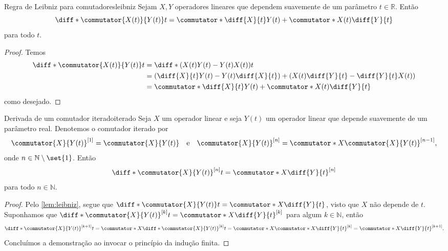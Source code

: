 \begin{lemma}{Regra de Leibniz para comutadores}{leibniz}
    Sejam \(X, Y\) operadores lineares que dependem suavemente de um parâmetro \(t \in \mathbb{R}\). Então
    \begin{equation*}
        \diff*{\commutator{X(t)}{Y(t)}}{t} = \commutator*{\diff{X}{t}}{Y(t)} + \commutator*{X(t)}{\diff{Y}{t}}
    \end{equation*}
    para todo \(t\).
\end{lemma}
\begin{proof}
    Temos
    \begin{align*}
        \diff*{\commutator{X(t)}{Y(t)}}{t} &= \diff*{\left(X(t)Y(t) - Y(t)X(t)\right)}{t}\\
                                           &= \left(\diff{X}{t} Y(t) - Y(t) \diff{X}{t}\right) + \left(X(t) \diff{Y}{t} - \diff{Y}{t} X(t)\right)\\
                                           &= \commutator*{\diff{X}{t}}{Y(t)} + \commutator*{X(t)}{\diff{Y}{t}}
    \end{align*}
    como desejado.
\end{proof}

\begin{lemma}{Derivada de um comutador iterado}{iterado}
    Seja \(X\) um operador linear e seja \(Y(t)\) um operador linear que depende suavemente de um parâmetro real. Denotemos o comutador iterado por
    \begin{equation*}
        \commutator{X}{Y(t)}^{[1]} = \commutator{X}{Y(t)}
        \quad\text{e}\quad
        \commutator{X}{Y(t)}^{[n]} = \commutator*{X}{\commutator{X}{Y(t)}^{[n-1]}},
    \end{equation*}
    onde \(n \in \mathbb{N} \setminus \set{1}\). Então
    \begin{equation*}
        \diff*{\commutator{X}{Y(t)}^{[n]}}{t} = \commutator*{X}{\diff{Y}{t}}^{[n]}
    \end{equation*}
    para todo \(n \in \mathbb{N}\).
\end{lemma}
\begin{proof}
    Pelo \cref{lem:leibniz}, segue que \(\diff*{\commutator{X}{Y(t)}}{t} = \commutator*{X}{\diff{Y}{t}}\), visto que \(X\) não depende de \(t\). Suponhamos que \(\diff*{\commutator{X}{Y(t)}^{[k]}}{t} = \commutator*{X}{\diff{Y}{t}}^{[k]}\) para algum \(k \in \mathbb{N}\), então
    \begin{equation*}
        \diff*{\commutator{X}{Y(t)}^{[k+1]}}{t} = \commutator*{X}{\diff*{\commutator{X}{Y(t)}^{[k]}}{t}} = \commutator*{X}{\commutator*{X}{\diff{Y}{t}}^{[k]}} = \commutator*{X}{\diff{Y}{t}}^{[k+1]}.
    \end{equation*}
    Concluímos a demonstração ao invocar o princípio da indução finita.
\end{proof}


